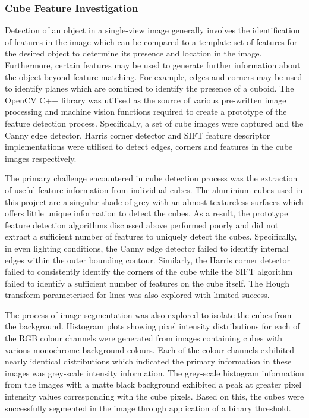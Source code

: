 \subsubsection{Cube Feature Investigation} \label{sec:Cube Feature Investigation}

Detection of an object in a single-view image generally involves the identification of features in the image which can be compared to a template set of features for the desired object to determine its presence and location in the image. Furthermore, certain features may be used to generate further information about the object beyond feature matching. For example, edges and corners may be used to identify planes which are combined to identify the presence of a cuboid. The OpenCV C++ library was utilised as the source of various pre-written image processing and machine vision functions required to create a prototype of the feature detection process. Specifically, a set of cube images were captured and the Canny edge detector, Harris corner detector and SIFT feature descriptor implementations were utilised to detect edges, corners and features in the cube images respectively. 

The primary challenge encountered in cube detection process was the extraction of useful feature information from individual cubes. The aluminium cubes used in this project are a singular shade of grey with an almost textureless surfaces which offers little unique information to detect the cubes. As a result, the prototype feature detection algorithms discussed above performed poorly and did not extract a sufficient number of features to uniquely detect the cubes. Specifically, in even lighting conditions, the Canny edge detector failed to identify internal edges within the outer bounding contour. Similarly, the Harris corner detector failed to consistently identify the corners of the cube while the SIFT algorithm failed to identify a sufficient number of features on the cube itself. The Hough transform parameterised for lines was also explored with limited success.  

The process of image segmentation was also explored to isolate the cubes from the background. Histogram plots showing pixel intensity distributions for each of the RGB colour channels were generated from images containing cubes with various monochrome background colours. Each of the colour channels exhibited nearly identical distributions which indicated the primary information in these images was grey-scale intensity information. The grey-scale histogram information from the images with a matte black background exhibited a peak at greater pixel intensity values corresponding with the cube pixels. Based on this, the cubes were successfully segmented in the image through application of a binary threshold. 

